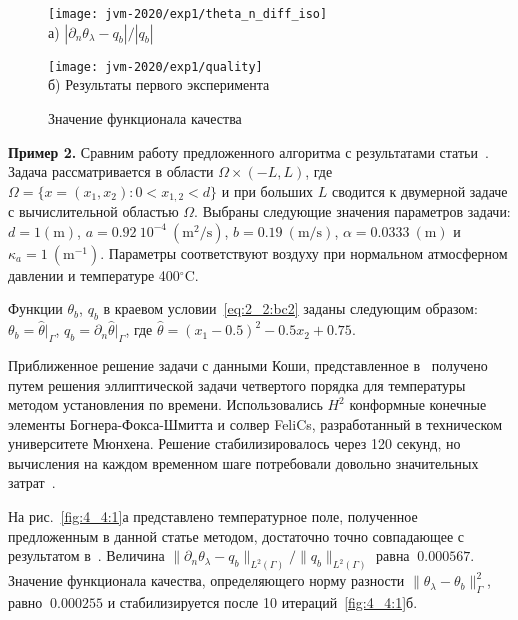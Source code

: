 \begin{figure}[ht]
    \begin{minipage}[b][][b]{0.49\linewidth}
        \centering
        \texttt{[image: jvm-2020/exp1/theta\_n\_diff\_iso]}
        \\ а) $|\partial_n\theta_\lambda-q_b|/|q_b|$
    \end{minipage}
    \hfill
    \begin{minipage}[b][][b]{0.49\linewidth}
        \centering
        \texttt{[image: jvm-2020/exp1/quality]}
        \\ б) Результаты первого эксперимента
    \end{minipage}
    \caption{Значение функционала качества}
    \label{fig:4_4:0}
\end{figure}

\textbf{Пример 2.}
Сравним работу предложенного алгоритма с результатами статьи~\cite{Chebotarev2019Problem}.
Задача рассматривается в области $\Omega \times (-L,L)$,
где $\Omega = \{ x = (x_1,x_2) \colon 0 < x_{1,2} < d\}$
и при больших $L$ сводится к двумерной задаче с вычислительной областью $\Omega$.
Выбраны следующие значения параметров задачи:
$d = \mathrm{1(m)}$, $a = 0.92~10^{-4}~\mathrm{(m^2/s)}$, $b= 0.19~\mathrm{(m/s)}$,
$\alpha = 0.0333~\mathrm{(m)}$ и $\kappa_a = 1~\mathrm{(m^{-1})}$.
Параметры соответствуют воздуху при нормальном атмосферном давлении и температуре 400$^\circ$C\@.

Функции $\theta_b$, $q_b$ в краевом условии~\eqref{eq:2_2:bc2} заданы следующим образом:
$\theta_b = \widehat{\theta}|_{\Gamma}$, $q_b = \partial_n \widehat{\theta}|_{\Gamma}$, где
$\widehat{\theta} = (x_1-0.5)^2 - 0.5x_2+0.75$.

Приближенное решение задачи с данными Коши, представленное в~\cite{Chebotarev2019Problem}
получено путем решения эллиптической задачи четвертого
порядка для температуры методом установления по времени.
Использовались $H^2$ конформные конечные элементы Богнера-Фокса-Шмитта и
солвер FeliCs, разработанный в техническом университете Мюнхена.
Решение стабилизировалось через 120 секунд, но вычисления на каждом временном
шаге потребовали довольно значительных затрат~\cite{Chebotarev2019Problem}.

На рис.~\ref{fig:4_4:1}а представлено температурное поле, полученное
предложенным в данной статье методом, достаточно
точно совпадающее с результатом в~\cite{Chebotarev2019Problem}.
Величина $\|\partial_n\theta_\lambda-q_b\|_{L^2(\Gamma)}/\|q_b\|_{L^2(\Gamma)}$ равна $~0.000567$.
Значение функционала качества, определяющего норму разности $\|\theta_\lambda -\theta_b\|^2_\Gamma$,
равно $~0.000255$ и стабилизируется после 10 итераций~\ref{fig:4_4:1}б.

